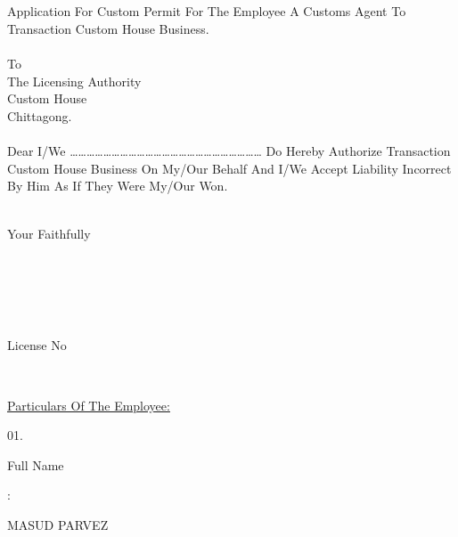 \documentclass[12pt]{article}
\begin{document}
\pagestyle{empty}
\begin{minipage}[t]{1\linewidth}
\\
\\
\end{minipage}
\\
\\
Application For Custom Permit For
The Employee A Customs Agent
To Transaction Custom House Business.
\\
\\
To
\\
The Licensing Authority
\\
Custom House
\\
Chittagong.
\\
\\
Dear
I/We …………………………………………………………… Do
Hereby Authorize Transaction Custom House Business
On My/Our Behalf And I/We
Accept Liability Incorrect
By Him As If They Were My/Our Won.
\\
\\
\begin{minipage}[t]{0.6\linewidth}
\hspace{1em}
\end{minipage}
\begin{minipage}[t]{0.4\linewidth}
Your Faithfully
\end{minipage}
\\
\\
\\
\\
\begin{minipage}[t]{0.61\linewidth}
\hspace{1em}
\end{minipage}
\begin{minipage}[t]{0.39\linewidth}
License No
\end{minipage}
\\
\begin{minipage}[t]{1\linewidth}
\underline{Particulars Of The Employee:}
\\
\end{minipage}
\begin{minipage}[t]{0.05\linewidth}
01.
\end{minipage}
\begin{minipage}[t]{0.55\linewidth}
Full Name
\end{minipage}
\begin{minipage}[t]{0.02\linewidth}
:
\end{minipage}
\begin{minipage}[t]{0.38\linewidth}
MASUD PARVEZ
\end{minipage}
\end{document}
